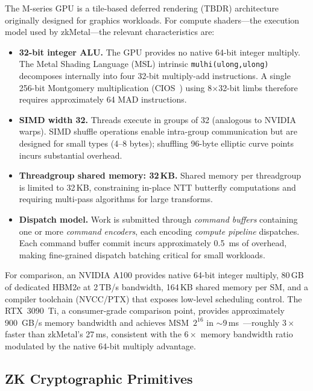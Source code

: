 \documentclass[letterpaper,twocolumn,10pt]{article}
\newcommand{\sys}{zkMetal\xspace}
\begin{document}
The M-series GPU is a tile-based deferred rendering (TBDR) architecture
originally designed for graphics workloads. For compute shaders---the
execution model used by \sys---the relevant characteristics are:

\begin{itemize}
\item \textbf{32-bit integer ALU.} The GPU provides no native 64-bit
  integer multiply. The Metal Shading Language (MSL) intrinsic
  \texttt{mulhi(ulong,ulong)} decomposes internally into four 32-bit
  multiply-add instructions. A single 256-bit Montgomery multiplication
  (CIOS~\cite{cios}) using 8$\times$32-bit limbs therefore requires
  approximately 64 MAD instructions.

\item \textbf{SIMD width 32.} Threads execute in groups of 32 (analogous
  to NVIDIA warps). SIMD shuffle operations enable intra-group
  communication but are designed for small types (4--8 bytes); shuffling
  96-byte elliptic curve points incurs substantial overhead.

\item \textbf{Threadgroup shared memory: 32\,KB.} Shared memory per
  threadgroup is limited to 32\,KB, constraining in-place NTT butterfly
  computations and requiring multi-pass algorithms for large transforms.

\item \textbf{Dispatch model.} Work is submitted through \emph{command
  buffers} containing one or more \emph{command encoders}, each encoding
  \emph{compute pipeline} dispatches. Each command buffer commit incurs
  approximately 0.5~ms of overhead, making fine-grained dispatch batching
  critical for small workloads.
\end{itemize}

\noindent
For comparison, an NVIDIA A100 provides native 64-bit integer multiply,
80\,GB of dedicated HBM2e at 2\,TB/s bandwidth, 164\,KB shared memory per
SM, and a compiler toolchain (NVCC/PTX) that exposes low-level scheduling
control. The RTX~3090~Ti, a consumer-grade comparison point, provides
approximately 900~GB/s memory bandwidth and achieves MSM~$2^{16}$ in
${\sim}$9\,ms~\cite{icicle}---roughly $3\times$ faster than \sys's
27\,ms, consistent with the $6\times$ memory bandwidth ratio modulated by
the native 64-bit multiply advantage.

\subsection{ZK Cryptographic Primitives}
\label{sec:zk-primitives}
\end{document}
